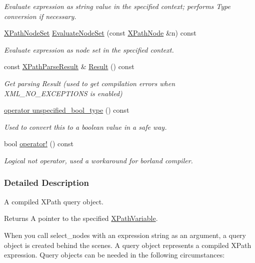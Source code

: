 \begin{DoxyCompactItemize}
\begin{DoxyCompactList}\small\item\em Evaluate expression as string value in the specified context; performs Type conversion if necessary. \item\end{DoxyCompactList}\item 
\hyperlink{classphys_1_1xml_1_1XPathNodeSet}{XPathNodeSet} \hyperlink{classphys_1_1xml_1_1XPathQuery_af00ba3d0346ccc01f249274947191333}{EvaluateNodeSet} (const \hyperlink{classphys_1_1xml_1_1XPathNode}{XPathNode} \&n) const 
\begin{DoxyCompactList}\small\item\em Evaluate expression as node set in the specified context. \item\end{DoxyCompactList}\item 
const \hyperlink{structphys_1_1xml_1_1XPathParseResult}{XPathParseResult} \& \hyperlink{classphys_1_1xml_1_1XPathQuery_a83f2039e91105c9cd0dcc7d524359198}{Result} () const 
\begin{DoxyCompactList}\small\item\em Get parsing Result (used to get compilation errors when XML\_\-NO\_\-EXCEPTIONS is enabled) \item\end{DoxyCompactList}\item 
\hyperlink{classphys_1_1xml_1_1XPathQuery_a1c6a8e78133a177792ade031f4ed0a89}{operator unspecified\_\-bool\_\-type} () const 
\begin{DoxyCompactList}\small\item\em Used to convert this to a boolean value in a safe way. \item\end{DoxyCompactList}\item 
bool \hyperlink{classphys_1_1xml_1_1XPathQuery_afe0b62e0ab607855f5267b0690bda33b}{operator!} () const 
\begin{DoxyCompactList}\small\item\em Logical not operator, used a workaround for borland compiler. \item\end{DoxyCompactList}\end{DoxyCompactItemize}


\subsubsection{Detailed Description}
A compiled XPath query object. \begin{DoxyReturn}{Returns}
A pointer to the specified \hyperlink{classphys_1_1xml_1_1XPathVariable}{XPathVariable}.
\end{DoxyReturn}
When you call select\_\-nodes with an expression string as an argument, a query object is created behind the scenes. A query object represents a compiled XPath expression. Query objects can be needed in the following circumstances: \par

